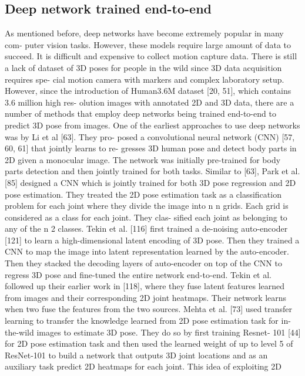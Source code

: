 \subsection{Deep network trained end-to-end}

As mentioned before, deep networks have become extremely popular in many com-
puter vision tasks. However, these models require large amount of data to succeed.
It is difficult and expensive to collect motion capture data. There is still a lack of
dataset of 3D poses for people in the wild since 3D data acquisition requires spe-
cial motion camera with markers and complex laboratory setup. However, since the
introduction of Human3.6M dataset [20, 51], which contains 3.6 million high res-
olution images with annotated 2D and 3D data, there are a number of methods that
employ deep networks being trained end-to-end to predict 3D pose from images.
One of the earliest approaches to use deep networks was by Li et al [63]. They pro-
posed a convolutional neural network (CNN) [57, 60, 61] that jointly learns to re-
gresses 3D human pose and detect body parts in 2D given a monocular image. The
network was initially pre-trained for body parts detection and then jointly trained
for both tasks. Similar to [63], Park et al. [85] designed a CNN which is jointly
trained for both 3D pose regression and 2D pose estimation. They treated the 2D
pose estimation task as a classification problem for each joint where they divide the
image into n n grids. Each grid is considered as a class for each joint. They clas-
sified each joint as belonging to any of the n 2 classes. Tekin et al. [116] first trained
a de-noising auto-encoder [121] to learn a high-dimensional latent encoding of 3D
pose. Then they trained a CNN to map the image into latent representation learned
by the auto-encoder. Then they stacked the decoding layers of auto-encoder on
top of the CNN to regress 3D pose and fine-tuned the entire network end-to-end.
Tekin et al. followed up their earlier work in [118], where they fuse latent features
learned from images and their corresponding 2D joint heatmaps. Their network
learns when two fuse the features from the two sources. Mehta et al. [73] used
transfer learning to transfer the knowledge learned from 2D pose estimation task
for in-the-wild images to estimate 3D pose. They do so by first training Resnet-
101 [44] for 2D pose estimation task and then used the learned weight of up to
level 5 of ResNet-101 to build a network that outputs 3D joint locations and as
an auxiliary task predict 2D heatmaps for each joint. This idea of exploiting 2D

